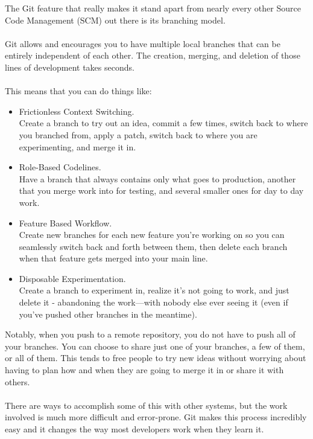 The Git feature that really makes it stand apart from nearly every
other Source Code Management (SCM) out there is its branching model.\\
\\
Git allows and encourages you to have multiple local branches that can
be entirely independent of each other. The creation, merging, and
deletion of those lines of development takes seconds.\\ \\
This means that you can do things like:
\begin{itemize}
\item Frictionless Context Switching.\\ Create a branch to try out an
idea, commit a few times, switch back to where you branched from,
apply a patch, switch back to where you are experimenting, and merge
it in.
\item Role-Based Codelines. \\ Have a branch that always contains only
what goes to production, another that you merge work into for testing,
and several smaller ones for day to day work.
\item Feature Based Workflow. \\ Create new branches for each new
feature you're working on so you can seamlessly switch back and forth
between them, then delete each branch when that feature gets merged
into your main line.
\item Disposable Experimentation.\\  Create a branch to experiment in,
realize it's not going to work, and just delete it - abandoning the
work—with nobody else ever seeing it (even if you've pushed other
branches in the meantime).
\end{itemize}
Notably, when you push to a remote repository, you do not have to push
all of your branches. You can choose to share just one of your
branches, a few of them, or all of them. This tends to free people to
try new ideas without worrying about having to plan how and when they
are going to merge it in or share it with others.\\ \\
There are ways to accomplish some of this with other systems, but the
work involved is much more difficult and error-prone. Git makes this
process incredibly easy and it changes the way most developers work
when they learn it.

